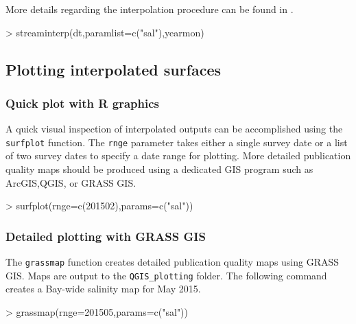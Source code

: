 \documentclass[12pt]{article}
\begin{document}
More details regarding the interpolation procedure can be found in \cite{stachelek2015application}.

\begin{Schunk}
\begin{Sinput}
> streaminterp(dt,paramlist=c("sal"),yearmon)
\end{Sinput}
\end{Schunk}

\subsection{\label{sec:plottingsurf}Plotting interpolated surfaces}

\subsubsection{Quick plot with R graphics}

A quick visual inspection of interpolated outputs can be accomplished using the \nohyphens{\texttt{surfplot}} function. The \texttt{rnge} parameter takes either a single survey date or a list of two survey dates to specify a date range for plotting. More detailed publication quality maps should be produced using a dedicated GIS program such as ArcGIS,QGIS, or GRASS GIS.

\begin{Schunk}
\begin{Sinput}
> surfplot(rnge=c(201502),params=c("sal"))
\end{Sinput}
\end{Schunk}



\subsubsection{Detailed plotting with GRASS GIS}

The \texttt{grassmap} function creates detailed publication quality maps using GRASS GIS. Maps are output to the \verb|QGIS_plotting| folder. The following command creates a Bay-wide salinity map for May 2015.

\begin{Schunk}
\begin{Sinput}
> grassmap(rnge=201505,params=c("sal"))
\end{Sinput}
\end{Schunk}
\end{document}

